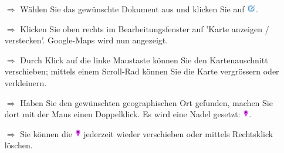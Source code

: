 \documentclass{article}
\begin{document}
\begin{multicols}{2}
\begin{tcolorbox}[colback=blue!5,colframe=blue!40!black,title=Dokumente mit Google-Maps verknüpfen]
\begin{itemize}
  \item[$\Longrightarrow$] Wählen Sie das gewünschte Dokument aus und klicken Sie auf  \includegraphics[height=10pt]{Icons/bearbeiten.jpg}.
  \item[$\Longrightarrow$] Klicken Sie oben rechts im Bearbeitungsfenster auf 'Karte anzeigen / verstecken'. Google-Maps wird nun angezeigt.
  \item[$\Longrightarrow$] Durch Klick auf die linke Maustaste können Sie den Kartenauschnitt verschieben; mittels einem Scroll-Rad können Sie die Karte vergrössern oder verkleinern.
  \item[$\Longrightarrow$] Haben Sie den gewünschten geographischen Ort gefunden, machen Sie dort mit der Maus einen Doppelklick. Es wird eine Nadel gesetzt: \includegraphics[height=10pt]{Icons/vNadel.jpg}.
	\item[$\Longrightarrow$] Sie können die \includegraphics[height=10pt]{Icons/vNadel.jpg} jederzeit wieder verschieben oder mittels Rechtsklick löschen.
\end{itemize}
\end{tcolorbox}


\end{multicols}

\end{document}
